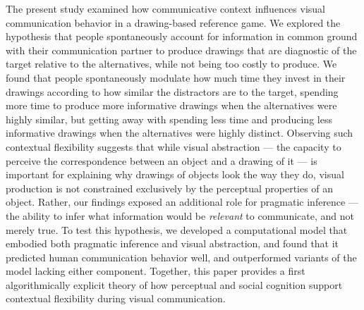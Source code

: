 \documentclass[9pt,twocolumn,twoside]{pnas-new}
\begin{document}
The present study examined how communicative context influences visual communication behavior in a drawing-based reference game. 
We explored the hypothesis that people spontaneously account for information in common ground with their communication partner to produce drawings that are diagnostic of the target relative to the alternatives, while not being too costly to produce. 
We found that people spontaneously modulate how much time they invest in their drawings according to how similar the distractors are to the target, spending more time to produce more informative drawings when the alternatives were highly similar, but getting away with spending less time and producing less informative drawings when the alternatives were highly distinct.
Observing such contextual flexibility suggests that while visual abstraction --- the capacity to perceive the correspondence between an object and a drawing of it --- is important for explaining why drawings of objects look the way they do, visual production is not constrained exclusively by the perceptual properties of an object.  
Rather, our findings exposed an additional role for pragmatic inference --- the ability to infer what information would be \textit{relevant} to communicate, and not merely true.
To test this hypothesis, we developed a computational model that embodied both pragmatic inference and visual abstraction, and found that it predicted human communication behavior well, and outperformed variants of the model lacking either component. 
Together, this paper provides a first algorithmically explicit theory of how perceptual and social cognition support contextual flexibility during visual communication.
\end{document}
